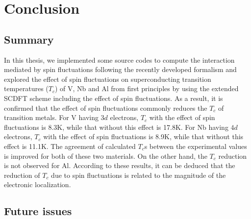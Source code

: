 

%
%
\chapter{Conclusion}
\label{conclusion}

\section{Summary}
In this thesis, we implemented some source codes to compute the interaction mediated by spin fluctuations
following the recently developed formalism\cite{Essenberger2014}
and explored the effect of spin fluctuations on superconducting transition temperatures ($T_c$)
of V, Nb and Al from first principles by using the extended SCDFT scheme including the effect of 
spin fluctuations\cite{Essenberger2014}.
As a result, it is confirmed that the effect of spin fluctuations commonly
reduces the $T_c$ of transition metals. 
For V having $3d$ electrons, $T_c$ with the effect of spin fluctuations is 8.3K, while that 
without this effect is 17.8K.
For Nb having $4d$ electrons, $T_c$ with the effect of spin fluctuations is 8.9K, while that 
without this effect is 11.1K.
The agreement of calculated $T_c$s between the experimental values is improved for both of these 
two materials. On the other hand, the $T_c$ reduction is not observed for Al.
According to these results, it can be deduced that the reduction of $T_c$ due to spin fluctuations
is related to the magnitude of the electronic localization.

\section{Future issues}

